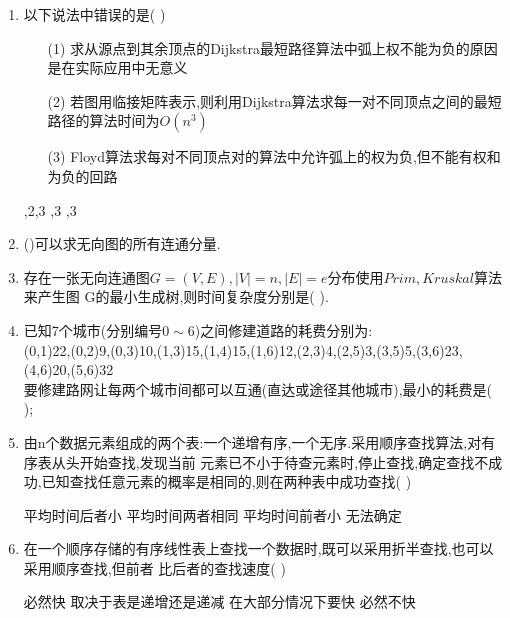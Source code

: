 \documentclass[12pt, a4paper, oneside, UTF8]{ctexbook}
\begin{document}
\begin{enumerate}
    \item 以下说法中错误的是(   ) 
    \begin{enumerate}
        \item [(1)] 求从源点到其余顶点的Dijkstra最短路径算法中弧上权不能为负的原因是在实际应用中无意义 
        \item [(2)] 若图用临接矩阵表示,则利用Dijkstra算法求每一对不同顶点之间的最短路径的算法时间为$O(n^3)$ 
        \item [(3)] Floyd算法求每对不同顶点对的算法中允许弧上的权为负,但不能有权和为负的回路 
    \end{enumerate}
    \begin{choices}
        ,2,3  ,3 ,3 
    \end{choices}

    \item ()可以求无向图的所有连通分量.  

    \item 存在一张无向连通图$G=(V,E),\left|V\right|=n,\left|E\right|=e$分布使用$Prim,Kruskal$算法来产生图
    G的最小生成树,则时间复杂度分别是(  ). 


    \item 已知7个城市(分别编号$0\sim 6$)之间修建道路的耗费分别为: \\
    (0,1)22,(0,2)9,(0,3)10,(1,3)15,(1,4)15,(1,6)12,(2,3)4,(2,5)3,(3,5)5,(3,6)23,(4,6)20,(5,6)32\\
    要修建路网让每两个城市间都可以互通(直达或途径其他城市),最小的耗费是(    ); 


    \item 由n个数据元素组成的两个表:一个递增有序,一个无序.采用顺序查找算法,对有序表从头开始查找,发现当前
    元素已不小于待查元素时,停止查找,确定查找不成功,已知查找任意元素的概率是相同的,则在两种表中成功查找(   ) 
    \begin{choices}[2]
        \task 平均时间后者小
        \task 平均时间两者相同
        \task 平均时间前者小
        \task 无法确定
    \end{choices}

    \item 在一个顺序存储的有序线性表上查找一个数据时,既可以采用折半查找,也可以采用顺序查找,但前者
    比后者的查找速度(   ) 
    \begin{choices}[2]
        \task 必然快
        \task 取决于表是递增还是递减
        \task 在大部分情况下要快
        \task 必然不快 
    \end{choices}


\end{enumerate}
\end{document}
